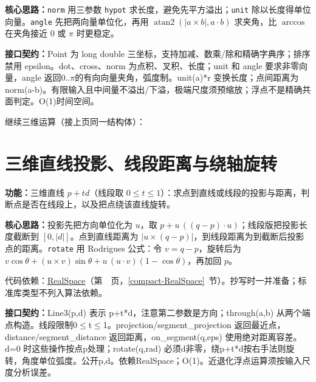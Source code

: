 \textbf{核心思路：}\allowbreak \texttt{norm} 用三参数 \texttt{hypot} 求长度，避免先平方溢出；\texttt{unit} 除以长度得单位向量。\texttt{angle} 先把两向量单位化，再用 $\operatorname{atan2}(|a\times b|,a\cdot b)$ 求夹角，比 $\arccos$ 在夹角接近 $0$ 或 $\pi$ 时更稳定。



{\sloppy{}\noindent\textbf{接口契约：}Point 为 long double 三坐标，支持加减、数乘/除和精确字典序；排序禁用 epsilon。dot、cross、norm 为点积、叉积、长度；unit 和 angle 要求非零向量，angle 返回0..$\pi$的有向向量夹角，弧度制。unit(a)*r 变换长度；点间距离为 norm(a-b)。有限输入且中间量不溢出/下溢，极端尺度须预缩放；浮点不是精确共面判定。O(1)时间空间。\par}



\newpage

\noindent 继续三维运算（接上页同一结构体）：



\section{三维直线投影、线段距离与绕轴旋转}\label{compact-Line3}

\noindent\textbf{功能：}\allowbreak 三维直线 $p+td$（线段取 $0\le t\le1$）：求点到直线或线段的投影与距离，判断点是否在线段上，以及把点绕该直线旋转。

\textbf{核心思路：}\allowbreak 投影先把方向单位化为 $u$，取 $p+u\,((q-p)\cdot u)$；线段版把投影长度截断到 $[0,|d|]$。点到直线距离为 $|u\times(q-p)|$，到线段距离为到截断后投影点的距离。\texttt{rotate} 用 Rodrigues 公式：令 $v=q-p$，旋转后为 $v\cos\theta+(u\times v)\sin\theta+u\,(u\cdot v)(1-\cos\theta)$，再加回 $p$。

代码依赖：\hyperref[compact-RealSpace]{RealSpace}（第~\pageref{compact-RealSpace}~页，\ref{compact-RealSpace}~节）。抄写时一并准备；标准库类型不列入算法依赖。

{\sloppy{}\noindent\textbf{接口契约：}Line3(p,d) 表示 p+t*d，注意第二参数是方向；through(a,b) 从两个端点构造。线段限制0$\le$t$\le$1。projection/segment\_projection 返回最近点，distance/segment\_distance 返回距离，on\_segment(q,eps) 使用绝对距离容差。d=0 时这些操作按点p处理；rotate(q,rad) 必须d非零，绕p+t*d按右手法则旋转，角度单位弧度。公开p,d。依赖RealSpace；O(1)。近退化浮点运算须按输入尺度分析误差。\par}

